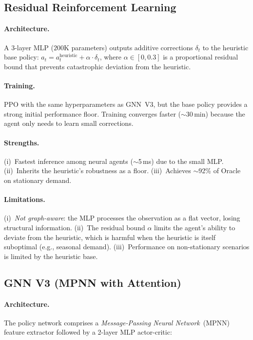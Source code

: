 \subsection{Residual Reinforcement Learning}

\paragraph{Architecture.}
A 3-layer MLP ($200\text{K}$ parameters) outputs additive corrections
$\delta_t$ to the heuristic base policy:
$a_t = a_t^{\text{heuristic}} + \alpha \cdot \delta_t$, where
$\alpha \in [0, 0.3]$ is a proportional residual bound that
prevents catastrophic deviation from the heuristic.

\paragraph{Training.}
PPO with the same hyperparameters as GNN~V3, but the base policy
provides a strong initial performance floor. Training converges
faster ($\sim$30\,min) because the agent only needs to learn
small corrections.

\paragraph{Strengths.} (i)~Fastest inference among neural agents
($\sim$5\,ms) due to the small MLP. (ii)~Inherits the heuristic's
robustness as a floor. (iii)~Achieves $\sim$92\% of Oracle on
stationary demand.

\paragraph{Limitations.} (i)~\emph{Not graph-aware}: the MLP processes
the observation as a flat vector, losing structural information.
(ii)~The residual bound $\alpha$ limits the agent's ability to deviate
from the heuristic, which is harmful when the heuristic is itself
suboptimal (e.g., seasonal demand). (iii)~Performance on
non-stationary scenarios is limited by the heuristic base.

\subsection{GNN V3 (MPNN with Attention)}

\paragraph{Architecture.}
The policy network comprises a \emph{Message-Passing Neural Network}~(MPNN)
feature extractor followed by a 2-layer MLP actor-critic:

